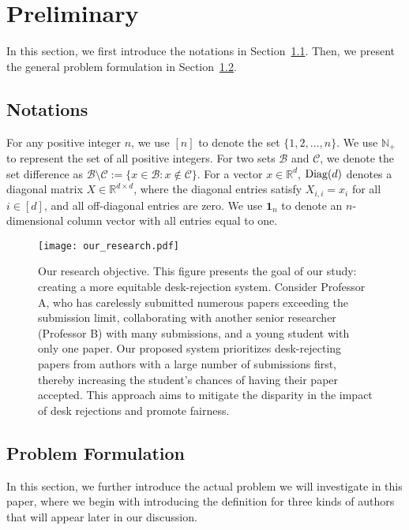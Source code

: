 

\section{Preliminary} \label{sec:preliminary}
In this section, we first introduce the notations in Section~\ref{sec:notations}. Then, we present the general problem formulation in Section~\ref{sec:problem_formulation}.

\subsection{Notations}\label{sec:notations}
For any positive integer $n$, we use $[n]$ to denote the set $\{1, 2, \ldots, n\}$. We use $\mathbb{N}_+$ to represent the set of all positive integers. For two sets $\mathcal{B}$ and $\mathcal{C}$, we denote the set difference as $\mathcal{B} \setminus \mathcal{C}:=\{x\in \mathcal{B}:x\notin\mathcal{C}\}$. For a vector $x \in \mathbb{R}^d$, $\operatorname{Diag}(d)$ denotes a diagonal matrix $X \in \mathbb{R}^{d \times d}$, where the diagonal entries satisfy $X_{i,i} = x_i$ for all $i \in [d]$, and all off-diagonal entries are zero. We use $\mathbf{1}_n$ to denote an $n$-dimensional column vector with all entries equal to one.


\begin{figure}[!ht]
    \centering
    \texttt{[image: our\_research.pdf]}
    \caption{
    Our research objective. This figure presents the goal of our study: creating a more equitable desk-rejection system. Consider Professor A, who has carelessly submitted numerous papers exceeding the submission limit, collaborating with another senior researcher (Professor B) with many submissions, and a young student with only one paper. Our proposed system prioritizes desk-rejecting papers from authors with a large number of submissions first, thereby increasing the student’s chances of having their paper accepted. This approach aims to mitigate the disparity in the impact of desk rejections and promote fairness.
    }
    \label{fig:our_research}
\end{figure}

\subsection{Problem Formulation} \label{sec:problem_formulation}

In this section, we further introduce the actual problem we will investigate in this paper, where we begin with introducing the definition for three kinds of authors that will appear later in our discussion. 


